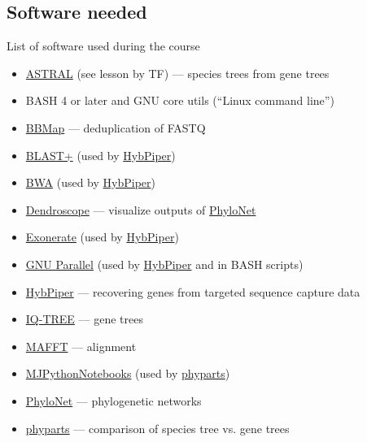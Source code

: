 \documentclass[compress,  xelatex, 11pt, xcolor=x11names, aspectratio=169,
	hyperref={
		bookmarks=true,
		unicode=true,
		colorlinks=true,
		pdftitle={HybSeq course},
		plainpages=false,
		pdfauthor={Vojtech Zeisek},
		pdfsubject={Practical processing of HybSeq target enrichment sequencing data on computing grids like MetaCentrum},
		pdfcreator={XeLaTeX},
		pdfkeywords={BASH, command line, GNU, HybSeq, Linux, MetaCentrum, sequencing shell, target enrichment},
		linkcolor=Turquoise4, %
		anchorcolor=DodgerBlue4, %
		citecolor=DodgerBlue4, %
		filecolor=DodgerBlue4, %
		menucolor=Tan4, %
		urlcolor=DarkOliveGreen4 %
		},
	url={hyphens, lowtilde} %
	]{beamer}
\begin{document}
\subsection{Software needed}

\begin{frame}[allowframebreaks]{List of software used during the course}
	\begin{itemize}
		\item \href{https://github.com/smirarab/ASTRAL}{ASTRAL} (see lesson by TF) --- species trees from gene trees
		\item BASH 4 or later and GNU core utils (\enquote{Linux command line})
		\item \href{https://sourceforge.net/projects/bbmap/}{BBMap} --- deduplication of FASTQ
		\item \href{https://blast.ncbi.nlm.nih.gov/doc/blast-help/downloadblastdata.html\#downloadblastdata}{BLAST+} (used by \href{https://github.com/mossmatters/HybPiper/wiki}{HybPiper})
		\item \href{https://github.com/lh3/bwa}{BWA} (used by \href{https://github.com/mossmatters/HybPiper/wiki}{HybPiper})
		\item \href{https://www.wsi.uni-tuebingen.de/lehrstuehle/algorithms-in-bioinformatics/software/dendroscope/}{Dendroscope} --- visualize outputs of \href{https://phylogenomics.rice.edu/html/phylonet.html}{PhyloNet}
		\item \href{https://github.com/nathanweeks/exonerate}{Exonerate} (used by \href{https://github.com/mossmatters/HybPiper/wiki}{HybPiper})
		\item \href{https://www.gnu.org/software/parallel/}{GNU Parallel} (used by \href{https://github.com/mossmatters/HybPiper/wiki}{HybPiper} and in BASH scripts)
		\item \href{https://github.com/mossmatters/HybPiper/wiki}{HybPiper} --- recovering genes from targeted sequence capture data
		\item \href{https://iqtree.github.io/}{IQ-TREE} --- gene trees
		\item \href{https://mafft.cbrc.jp/alignment/software/}{MAFFT} --- alignment
		\item \href{https://github.com/mossmatters/MJPythonNotebooks}{MJPythonNotebooks} (used by \href{https://bitbucket.org/blackrim/phyparts}{phyparts})
		\item \href{https://phylogenomics.rice.edu/html/phylonet.html}{PhyloNet} --- phylogenetic networks
		\item \href{https://bitbucket.org/blackrim/phyparts}{phyparts} --- comparison of species tree vs. gene trees

\end{itemize}
\end{frame}
\end{document}
